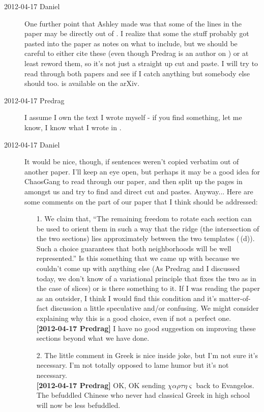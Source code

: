 \begin{description}
\item[2012-04-17 Daniel] One further point that Ashley made was that some
of the lines in the paper may be directly out of . I
realize that some the stuff probably got pasted into the paper as notes
on what to include, but we should be careful to either cite these (even
though Predrag is an author on ) or at least reword them,
so it's not just a straight up cut and paste. I will try to read through
both papers and see if I catch anything but somebody else should too.
 is available on the arXiv.

\item[2012-04-17 Predrag] I assume I own the text I wrote myself - if you
find something, let me know, I know what I wrote in .

\item[2012-04-17 Daniel] It would be nice, though, if sentences weren't copied
verbatim out of another paper. I'll keep an eye open, but perhaps it may be a
good idea for ChaosGang to read through our paper, and then split up the pages
in  amongst us and try to find and direct cut and pastes. Anyway...
Here are some comments on the \PoincSec part of our paper that I think should be addressed:
	\begin{itemize}
		\item[1.]We claim that, ``The remaining freedom to rotate each section can be
		used to orient them in such a way that the ridge (the intersection of the
		two sections) lies approximately between the two templates (\,(d)).
		Such a choice guarantees that both neighborhoods will be well represented.'' Is this
		something that we came up with because we couldn't come up with anything else
		(As Predrag and I discussed today, we don't know of a variational principle
		that fixes the two as in the case of slices) or is there something to it. If I
		was reading the paper as an outsider, I think I would find this condition and
		it's matter-of-fact discussion a little speculative and/or confusing. We might
		consider explaining why this is a good choice, even if not a perfect one.
        \\{\bf [2012-04-17 Predrag]} I have no good suggestion on improving these sections
        beyond what we have done.

		\item[2.] The little comment in Greek is nice inside joke, but
        I'm not sure it's necessary. I'm not totally opposed to lame humor but
        it's not necessary.
        \\{\bf [2012-04-17 Predrag]} OK, OK sending
        $\chi\alpha\rho\tau\eta\varsigma$ back to Evangelos. The
        befuddled Chinese who never had classical Greek in high school
        will now be less befuddled.


\end{itemize}
\end{description}
